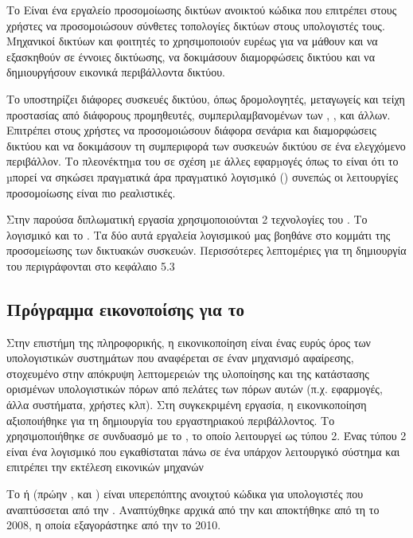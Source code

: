 Το  Είναι ένα εργαλείο προσομοίωσης δικτύων ανοικτού κώδικα που επιτρέπει στους χρήστες να προσομοιώσουν 
σύνθετες τοπολογίες δικτύων στους υπολογιστές τους. Μηχανικοί δικτύων και φοιτητές 
το χρησιμοποιούν ευρέως για να μάθουν και να εξασκηθούν σε έννοιες δικτύωσης, να δοκιμάσουν διαμορφώσεις δικτύου και να δημιουργήσουν εικονικά περιβάλλοντα δικτύου.


Το  υποστηρίζει διάφορες συσκευές δικτύου, όπως δρομολογητές, μεταγωγείς και τείχη προστασίας 
από διάφορους προμηθευτές, συμπεριλαμβανομένων των , ,  και άλλων. Επιτρέπει στους χρήστες να 
προσομοιώσουν διάφορα σενάρια και διαμορφώσεις δικτύου και να δοκιμάσουν τη συμπεριφορά των 
συσκευών δικτύου σε ένα ελεγχόμενο περιβάλλον. Το πλεονέκτηµα του  σε σχέση µε άλλες εφαρµογές όπως το  είναι ότι το  µπορεί να σηκώσει πραγµατικά  άρα πραγµατικό λογισµικό () συνεπώς οι λειτουργίες προσομοίωσης είναι πιο ρεαλιστικές.

Στην παρούσα διπλωματική εργασία χρησιμοποιούνται 2 τεχνολογίες του . Το  λογισμικό και το . Τα δύο αυτά εργαλεία λογισμικού μας βοηθάνε στο κομμάτι της προσομείωσης των δικτυακών συσκευών. Περισσότερες λεπτομέριες για τη δημιουργία του  περιγράφονται στο κεφάλαιο 5.3

\subsection{Πρόγραμμα εικονοποίσης για το }

Στην επιστήμη της πληροφορικής, η εικονικοποίηση  είναι ένας ευρύς όρος 
των υπολογιστικών συστημάτων που αναφέρεται σε έναν μηχανισμό αφαίρεσης, 
στοχευμένο στην απόκρυψη λεπτομερειών της υλοποίησης και της κατάστασης
ορισμένων υπολογιστικών πόρων από πελάτες των πόρων αυτών 
(π.χ. εφαρμογές, άλλα συστήματα, χρήστες κλπ). 
Στη συγκεκριμένη εργασία, η εικονικοποίηση αξιοποιήθηκε για τη δημιουργία του εργαστηριακού περιβάλλοντος. Το  χρησιμοποιήθηκε σε συνδυασμό με το , το οποίο λειτουργεί ως  τύπου 2. Ένας  τύπου 2 είναι ένα λογισμικό που εγκαθίσταται πάνω σε ένα υπάρχον λειτουργικό σύστημα και επιτρέπει την εκτέλεση εικονικών μηχανών

Το  ή  (πρώην ,  και ) είναι υπερεπόπτης
ανοιχτού κώδικα για υπολογιστές  που αναπτύσσεται από την .
Αναπτύχθηκε αρχικά από την 
και αποκτήθηκε από τη  το 2008, η οποία εξαγοράστηκε από την  το 2010.

